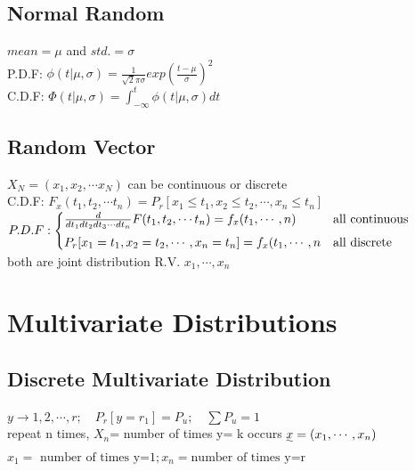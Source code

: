 \documentclass{article}
\begin{document}
            
\subsection{Normal Random}             
	$mean= \mu $ and $std.= \sigma $
	\\P.D.F: $\phi(t| \mu, \sigma)= \frac{1}{\sqrt{2} \pi \sigma }exp(\frac{t-\mu}{\sigma})^2$
	\\C.D.F: $\Phi(t| \mu, \sigma)=  \int_{-\infty}^{t} \phi(t| \mu, \sigma)dt$
        
\subsection{Random Vector}        
	$X_N=(x_1, x_2, \cdots x_N)$ can be continuous or discrete
	\\C.D.F: $F_x(t_1, t_2, \cdots t_n)= P_r[x_1\le t_1,x_2\le t_2, \cdots, x_n\le t_n]$
	\\$P.D.F: \begin{cases}
	\frac{d}{dt_1 dt_2 dt_3 \cdots dt_n} F(t_1, t_2, \cdots t_n)= f_{\uwave{x}}(t_1, \cdots, n) & \text{all continuous}\\
	P_r[x_1= t_1,x_2= t_2, \cdots, x_n=  t_n]=f_{x}(t_1, \cdots, n &\text{all discrete}  \end{cases}$
	\\both are joint distribution R.V. $x_1, \cdots, x_n$		


\section{Multivariate Distributions} 

\subsection{Discrete Multivariate Distribution}
$ y\rightarrow 1, 2, \cdots, r; \quad P_r[y=r_1]=P_u; \quad \sum P_u= 1$
\\repeat n times, $X_n$= number of times y= k occurs 
$\uwave{x}= (x_1, \cdots, x_n)$
$x_1= \text{ number of times y=1}; x_n= \text{number of times y=r}$
\end{document}
